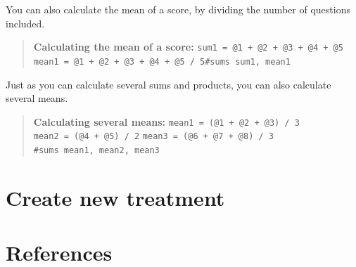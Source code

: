 \documentclass[]{book}
\begin{document}
You can also calculate the mean of a score, by dividing the number of questions included.

\begin{quote}
\textbf{Calculating the mean of a score:} \texttt{sum1\ =\ @1\ +\ @2\ +\ @3\ +\ @4\ +\ @5} \texttt{mean1\ =\ @1\ +\ @2\ +\ @3\ +\ @4\ +\ @5\ /\ 5}\texttt{\#sums\ sum1,\ mean1}
\end{quote}

Just as you can calculate several sums and products, you can also calculate several means.

\begin{quote}
\textbf{Calculating several means:} \texttt{mean1\ =\ (@1\ +\ @2\ +\ @3)\ /\ 3} \texttt{mean2\ =\ (@4\ +\ @5)\ /\ 2} \texttt{mean3\ =\ (@6\ +\ @7\ +\ @8)\ /\ 3} \texttt{\#sums\ mean1,\ mean2,\ mean3}
\end{quote}

\hypertarget{create-new-treatment}{%
\chapter{Create new treatment}\label{create-new-treatment}}

\hypertarget{references}{%
\chapter{References}\label{references}}


\end{document}
